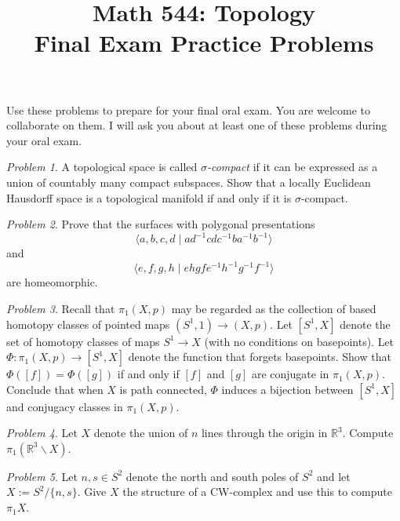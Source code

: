 \documentclass[11pt,twoside]{amsart}
\title{Math 544: Topology\\ Final Exam Practice Problems}
\theoremstyle{plain}
\theoremstyle{remark}
\newtheorem{prob}{Problem}
\theoremstyle{definition}
\theoremstyle{definition}
\newcommand{\RR}{\mathbb{R}}
\begin{document}
\maketitle

\noindent Use these problems to prepare for your final oral exam. You are welcome to collaborate on them. I will ask you about at least one of these problems during your oral exam.

\begin{prob}
A topological space is called \emph{$\sigma$-compact} if it can be expressed as a union of countably many compact subspaces. Show that a locally Euclidean Hausdorff space is a topological manifold if and only if it is $\sigma$-compact.
\end{prob}

\begin{prob}
Prove that the surfaces with polygonal presentations
\[
  \langle a,b,c,d\mid ad^{-1}cdc^{-1}ba^{-1}b^{-1}\rangle
\]
and
\[
  \langle e,f,g,h\mid ehgfe^{-1}h^{-1}g^{-1}f^{-1}\rangle
\]
are homeomorphic.
\end{prob}

\begin{prob}
Recall that $\pi_1(X,p)$ may be regarded as the collection of based homotopy classes of pointed maps $(S^1,1)\to (X,p)$. Let $[S^1,X]$ denote the set of homotopy classes of maps $S^1\to X$ (with no conditions on basepoints). Let $\Phi\colon \pi_1(X,p)\to [S^1,X]$ denote the function that forgets basepoints. Show that $\Phi([f]) = \Phi([g])$ if and only if $[f]$ and $[g]$ are conjugate in $\pi_1(X,p)$. Conclude that when $X$ is path connected, $\Phi$ induces a bijection between $[S^1,X]$ and conjugacy classes in $\pi_1(X,p)$.
\end{prob}

\begin{prob}
Let $X$ denote the union of $n$ lines through the origin in $\RR^3$. Compute $\pi_1(\RR^3\smallsetminus X)$.
\end{prob}

\begin{prob}
Let $n,s\in S^2$ denote the north and south poles of $S^2$ and let $X := S^2/\{n,s\}$. Give $X$ the structure of a CW-complex and use this to compute $\pi_1X$.
\end{prob}
\end{document}
